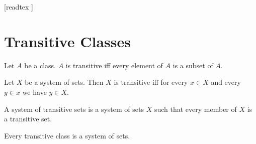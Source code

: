 \documentclass[10pt]{article}
\begin{document}
  \begin{imports}
    \begin{forthel}

      [readtex ]

    \end{forthel}
  \end{imports}


  \section{Transitive Classes}

  \begin{forthel}
    \begin{definition}
      Let $A$ be a class.
      $A$ is transitive iff every element of $A$ is a subset of $A$.
    \end{definition}
  \end{forthel}

  \begin{forthel}
    \begin{proposition}
      Let $X$ be a system of sets.
      Then $X$ is transitive iff for every $x \in X$ and every $y \in x$ we
      have $y \in X$.
    \end{proposition}
  \end{forthel}

  \begin{forthel}
    \begin{definition}
      A system of transitive sets is a system of sets $X$ such that every member
      of $X$ is a transitive set.
    \end{definition}
  \end{forthel}

  \begin{forthel}
    \begin{proposition}
      Every transitive class is a system of sets.
    \end{proposition}
  \end{forthel}
\end{document}
